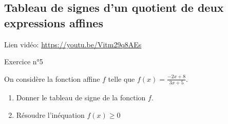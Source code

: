 \documentclass[12pt,a4paper]{article}
\begin{document}
\subsection{Tableau de signes d'un quotient de deux expressions affines }


\begin{minipage}{0.85\textwidth}
Lien vidéo:
\url{https://youtu.be/Vitm29q8AEs}
\end{minipage}
\begin{minipage}{0.2\textwidth}
\end{minipage}


\begin{mybox}{Exercice n°5}

On considère la fonction affine $f$ telle que $f(x)=\frac{-2x+8}{3x+5}$.
\begin{enumerate}
    \item Donner le tableau de signe de la fonction $f$.
    \item Résoudre l'inéquation $f(x)\geq 0$
\end{enumerate}


\end{mybox}
\begin{framed}
\vspace{4cm}
\end{framed}
\end{document}

